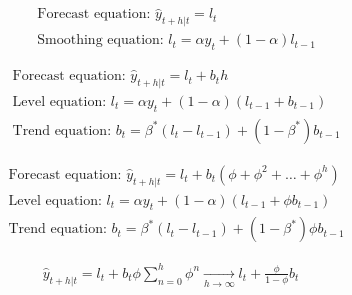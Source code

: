 \documentclass[12pt]{article}
\begin{document}
\begin{align*}
	&\text{Forecast equation: } \hat{y}_{t+h|t} = l_t \\
	&\text{Smoothing equation: } l_t = \alpha y_t + (1-\alpha) l_{t-1}
\end{align*}

\begin{align*}
	&\text{Forecast equation: } \hat{y}_{t+h|t} = l_t + b_t h\\
	&\text{Level equation: } l_t = \alpha y_t + (1-\alpha) (l_{t-1} + b_{t-1}) \\
	&\text{Trend equation: } b_t = \beta^*(l_t - l_{t-1}) + (1-\beta^*) b_{t-1}
\end{align*}

\begin{align*}
	&\text{Forecast equation: } \hat{y}_{t+h|t} = l_t + b_t (\phi + \phi^2 + \ldots + \phi^h)\\
	&\text{Level equation: } l_t = \alpha y_t + (1-\alpha) (l_{t-1} + \phi b_{t-1}) \\
	&\text{Trend equation: } b_t = \beta^*(l_t - l_{t-1}) + (1-\beta^*) \phi b_{t-1}
\end{align*}

\begin{align*}
	\hat{y}_{t+h|t} = l_t + b_t \phi \sum_{n=0}^h \phi^n \underset{h\rightarrow \infty}{\longrightarrow} l_t + \frac{\phi}{1-\phi} b_t
\end{align*}
\end{document}
